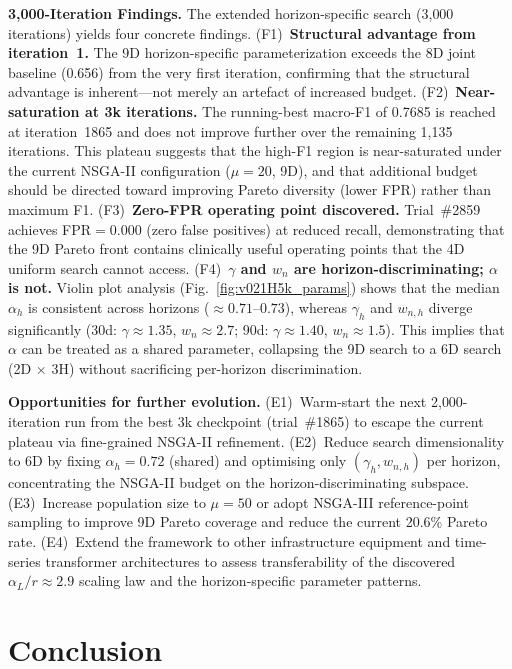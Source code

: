 ﻿\documentclass[twocolumn]{article}
\begin{document}
\textbf{3,000-Iteration Findings.}
The extended horizon-specific search (3{,}000 iterations) yields four concrete findings.
(F1)~\textbf{Structural advantage from iteration~1.}
The 9D horizon-specific parameterization exceeds the 8D joint baseline (0.656)
from the very first iteration, confirming that the structural advantage is
inherent---not merely an artefact of increased budget.
(F2)~\textbf{Near-saturation at 3k iterations.}
The running-best macro-F1 of 0.7685 is reached at iteration~1865 and does not
improve further over the remaining 1{,}135 iterations.
This plateau suggests that the high-F1 region is near-saturated under the current
NSGA-II configuration ($\mu{=}20$, 9D), and that additional budget should be directed
toward improving Pareto diversity (lower FPR) rather than maximum F1.
(F3)~\textbf{Zero-FPR operating point discovered.}
Trial~\#2859 achieves FPR$=$0.000 (zero false positives) at reduced recall,
demonstrating that the 9D Pareto front contains clinically useful operating points
that the 4D uniform search cannot access.
(F4)~\textbf{$\gamma$ and $w_n$ are horizon-discriminating; $\alpha$ is not.}
Violin plot analysis (Fig.~\ref{fig:v021H5k_params}) shows that the median
$\alpha_h$ is consistent across horizons ($\approx 0.71$--$0.73$), whereas
$\gamma_h$ and $w_{n,h}$ diverge significantly (30d: $\gamma{\approx}1.35$,
$w_n{\approx}2.7$; 90d: $\gamma{\approx}1.40$, $w_n{\approx}1.5$).
This implies that $\alpha$ can be treated as a shared parameter,
collapsing the 9D search to a 6D search (2D $\times$ 3H) without
sacrificing per-horizon discrimination.

\textbf{Opportunities for further evolution.}
(E1)~Warm-start the next 2{,}000-iteration run from the best 3k checkpoint
(trial~\#1865) to escape the current plateau via fine-grained NSGA-II refinement.
(E2)~Reduce search dimensionality to 6D by fixing $\alpha_h = 0.72$ (shared)
and optimising only $(\gamma_h, w_{n,h})$ per horizon,
concentrating the NSGA-II budget on the horizon-discriminating subspace.
(E3)~Increase population size to $\mu{=}50$ or adopt NSGA-III reference-point
sampling to improve 9D Pareto coverage and reduce the current 20.6\% Pareto rate.
(E4)~Extend the framework to other infrastructure equipment and time-series
transformer architectures to assess transferability of the discovered
$\alpha_L/r \approx 2.9$ scaling law and the horizon-specific parameter patterns.

\section{Conclusion}
\label{sec:conclusion}
\end{document}
